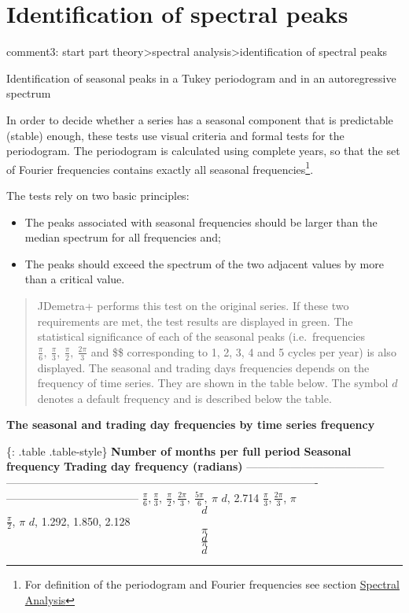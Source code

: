 \documentclass[
  letterpaper,
  DIV=11,
  numbers=noendperiod]{scrreprt}
\begin{document}
\hypertarget{identification-of-spectral-peaks}{%
\section{Identification of spectral
peaks}\label{identification-of-spectral-peaks}}

comment3: start part theory\textgreater spectral
analysis\textgreater identification of spectral peaks

Identification of seasonal peaks in a Tukey periodogram and in an
autoregressive spectrum

In order to decide whether a series has a seasonal component that is
predictable (stable) enough, these tests use visual criteria and formal
tests for the periodogram. The periodogram is calculated using complete
years, so that the set of Fourier frequencies contains exactly all
seasonal frequencies\footnote{For definition of the periodogram and
  Fourier frequencies see section
  \href{../theory/spectral.html}{Spectral Analysis}}.

The tests rely on two basic principles:

\begin{itemize}
\item
  The peaks associated with seasonal frequencies should be larger than
  the median spectrum for all frequencies and;
\item
  The peaks should exceed the spectrum of the two adjacent values by
  more than a critical value.
\end{itemize}

\begin{quote}
JDemetra+ performs this test on the original series. If these two
requirements are met, the test results are displayed in green. The
statistical significance of each of the seasonal peaks (i.e.~frequencies
\(\frac{\pi}{6},\ \frac{\pi}{3},\ \frac{\pi}{2},\ \frac{2\pi}{3}\) and
\$\$ corresponding to 1, 2, 3, 4 and 5 cycles per year) is
also displayed. The seasonal and trading days frequencies depends on the
frequency of time series. They are shown in the table below. The symbol
\(d\) denotes a default frequency and is described below the table.
\end{quote}

\textbf{The seasonal and trading day frequencies by time series
frequency}

\{: .table .table-style\} \textbar{}\textbf{Number of months per full
period} \textbar{} \textbf{Seasonal frequency} \textbar{}
\textbf{Trading day frequency (radians)}\textbar{}
\textbar--------------------------------------\textbar{}
-------------------------------------------------------------------------------------\textbar{}
------------------------------------\textbar{}  \textbar{}
\(\frac{\pi}{6},\frac{\pi}{3},\ \frac{\pi}{2},\frac{2\pi}{3},\ \frac{5\pi}{6},\ \pi\)
\textbar{} \(d\), 2.714\textbar{}  \textbar{}
\(\frac{\pi}{3},\frac{2\pi}{3}\), \(\pi\) \textbar{} \[d\] 
\textbar{} \(\frac{\pi}{2}\), \(\pi\) \textbar{} \(d\), 1.292, 1.850,
2.128\textbar{}  \textbar{} \[\pi\] \textbar{} \[d\]\textbar{}
 \textbar{} \[\pi\] \textbar{} \[d\]\textbar{}
\end{document}
